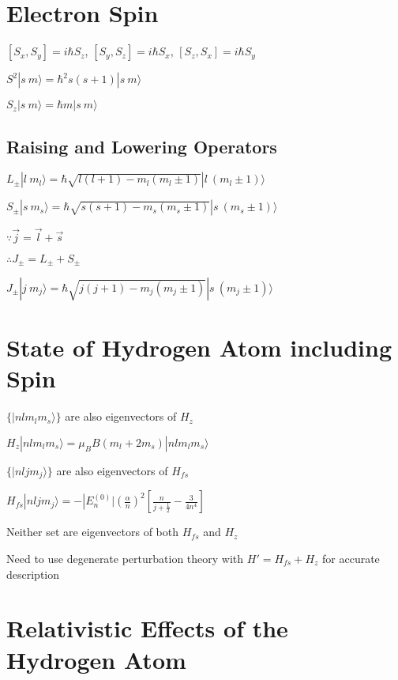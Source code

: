 \documentclass[12pt]{article}
\begin{document}
\begin{spacing}{2.0}
\section{Electron Spin}

$[S_x,S_y]= i\hbar S_z$, $[S_y,S_z]= i\hbar S_x$, $[S_z,S_x]= i\hbar S_y$

$S^2 |s\ m\rangle= \hbar^2s(s+1)|s\ m\rangle$

$S_z |s\ m\rangle = \hbar m|s\ m\rangle$



\subsection{Raising and Lowering Operators}

$L_{\pm} |l\ m_l \rangle = \hbar \sqrt{l(l+1)-m_l(m_l \pm 1)} |l\ (m_l \pm 1) \rangle$

$S_{\pm} |s\ m_s \rangle = \hbar \sqrt{s(s+1)-m_s(m_s \pm 1)} |s\ (m_s\pm 1) \rangle$

$\because \vec{j}= \vec{l}+ \vec{s}$

$\therefore J_{\pm}= L_{\pm} + S_{\pm}$

$J_{\pm} |j\ m_j \rangle = \hbar \sqrt{j(j+1)-m_j(m_j \pm 1)} |s\ (m_j \pm 1) \rangle$

\section{State of Hydrogen Atom including Spin}

$\{ |n l m_l m_s \rangle \}$ are also eigenvectors of $H_z$

$H_z |n l m_l m_s \rangle = \mu_B B (m_l+ 2m_s)|n l m_l m_s \rangle$

$\{ |n l j m_j \rangle \}$ are also eigenvectors of $H_{fs}$

$H_{fs} |n l j m_j \rangle = - |E_n^{(0)}| \left( \frac{\alpha}{n} \right)^2 \left[ \frac{n}{j+\frac{1}{2}} - \frac{3}{4n^4} \right]$

Neither set are eigenvectors of both $H_{fs}$ and $H_z$

Need to use degenerate perturbation theory with $H' = H_{fs}+ H_{z}$ for accurate description


\section{Relativistic Effects of the Hydrogen Atom}


\end{spacing}
\end{document}

